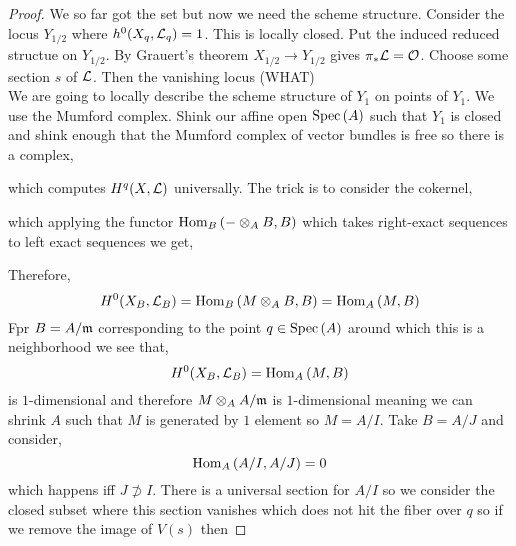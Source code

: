 \documentclass[12pt]{article}
\begin{document}
\begin{proof}
We so far got the set but now we need the scheme structure. Consider the locus $Y_{1/2}$ where $h^0(X_q, \mathcal{L}_q) = 1$. This is locally closed. Put the induced reduced structue on $Y_{1/2}$. By Grauert's theorem $X_{1/2} \to Y_{1/2}$ gives $\pi_* \mathcal{L} = \mathcal{O}_{}$. Choose some section $s$ of $\mathcal{L}$. Then the vanishing locus (WHAT)
\bigskip\\
We are going to locally describe the scheme structure of $Y_1$ on points of $Y_1$. We use the Mumford complex. Shink our affine open $\mathrm{Spec}\left( A \right)$ such that $Y_1$ is closed and shink enough that the Mumford complex of vector bundles is free so there is a complex,
\begin{center}
\end{center}
which computes $H^q(X, \mathcal{L})$ universally. The trick is to consider the cokernel,
\begin{center}
\end{center}
which applying the functor $\mathrm{Hom}_{B} \left( - \otimes_A B, B \right)$ which takes right-exact sequences to left exact sequences we get,
\begin{center}
\end{center}
Therefore,
\[ H^0(X_B, \mathcal{L}_B) = \mathrm{Hom}_{B} \left( M \otimes_A B, B \right) = \mathrm{Hom}_{A} \left( M, B \right) \]
Fpr $B = A / \mathfrak{m}$ corresponding to the point $q \in \mathrm{Spec}\left( A \right)$ around which this is a neighborhood we see that,
\[ H^0(X_B, \mathcal{L}_B) = \mathrm{Hom}_{A} \left( M, B \right) \]
is $1$-dimensional and therefore $M \otimes_A A /\mathfrak{m}$ is $1$-dimensional meaning we can shrink $A$ such that $M$ is generated by $1$ element so $M = A / I$. Take $B = A / J$ and consider,
\[ \mathrm{Hom}_{A} \left( A/I, A/J \right) = 0 \]
which happens iff $J \not\supset I$. There is a universal section for $A/I$ so we consider the closed subset where this section vanishes which does not hit the fiber over $q$ so if we remove the image of $V(s)$ then 
\end{proof}
\end{document}
